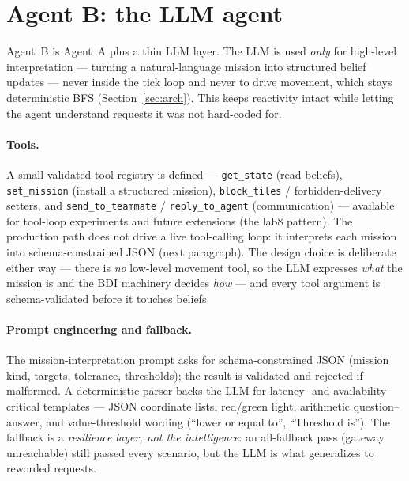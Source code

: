 \section{Agent B: the LLM agent}
\label{sec:llm}

Agent~B is Agent~A plus a thin LLM layer. The LLM is used \emph{only} for
high-level interpretation --- turning a natural-language mission into structured
belief updates --- never inside the tick loop and never to drive movement, which
stays deterministic BFS (Section~\ref{sec:arch}). This keeps reactivity intact
while letting the agent understand requests it was not hard-coded for.

\paragraph{Tools.} A small validated tool registry is defined ---
\texttt{get\_state} (read beliefs), \texttt{set\_mission} (install a structured
mission), \texttt{block\_tiles} / forbidden-delivery setters, and
\texttt{send\_to\_teammate} / \texttt{reply\_to\_agent} (communication) ---
available for tool-loop experiments and future extensions (the lab8 pattern).
The production path does not drive a live tool-calling loop: it interprets each
mission into schema-constrained JSON (next paragraph). The design choice is
deliberate either way --- there is \emph{no} low-level movement tool, so the LLM
expresses \emph{what} the mission is and the BDI machinery decides \emph{how} ---
and every tool argument is schema-validated before it touches beliefs.

\paragraph{Prompt engineering and fallback.} The mission-interpretation prompt
asks for schema-constrained JSON (mission kind, targets, tolerance, thresholds);
the result is validated and rejected if malformed. A deterministic parser backs
the LLM for latency- and availability-critical templates --- JSON coordinate
lists, red/green light, arithmetic question--answer, and value-threshold wording
(``lower or equal to'', ``Threshold is''). The fallback is a \emph{resilience
layer, not the intelligence}: an all-fallback pass (gateway unreachable) still
passed every scenario, but the LLM is what generalizes to reworded requests.

